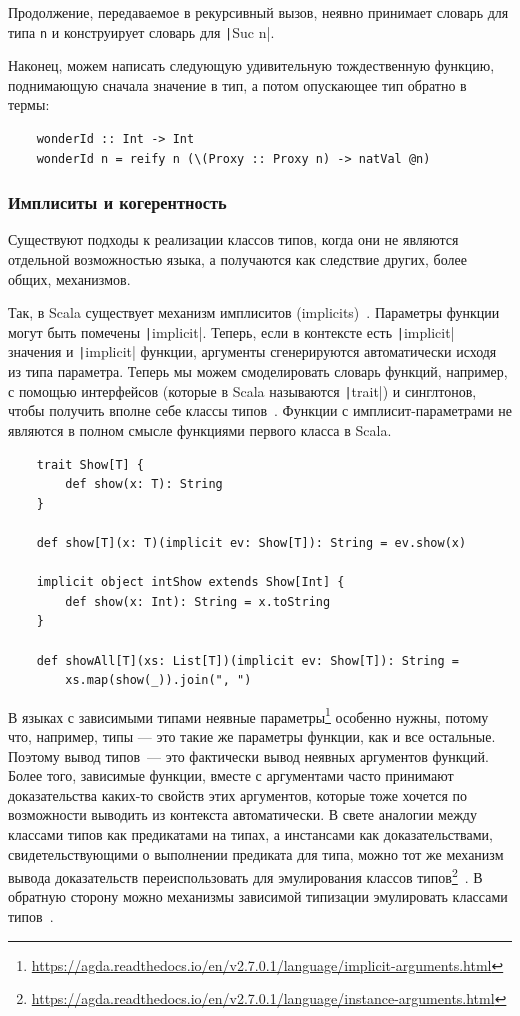 Продолжение, передаваемое в рекурсивный вызов, неявно принимает словарь для типа \texttt{n} и конструирует словарь для \texttt|Suc n|.

Наконец, можем написать следующую удивительную тождественную функцию, поднимающую сначала значение в тип, а потом опускающее тип обратно в термы:
\begin{verbatim}
    wonderId :: Int -> Int
    wonderId n = reify n (\(Proxy :: Proxy n) -> natVal @n)
\end{verbatim}

\subsubsection{Имплиситы и когерентность}

Существуют подходы к реализации классов типов, когда они не являются отдельной возможностью языка, а получаются как следствие других, более общих, механизмов.

Так, в Scala существует механизм имплиситов (implicits)~\cite{kvrikava2019scala}.
Параметры функции могут быть помечены \texttt|implicit|.
Теперь, если в контексте есть \texttt|implicit| значения и \texttt|implicit| функции, аргументы сгенерируются автоматически исходя из типа параметра.
Теперь мы можем смоделировать словарь функций, например, с помощью интерфейсов (которые в Scala называются \texttt|trait|) и синглтонов, чтобы получить вполне себе классы типов~\cite{oliveira2010type}.
Функции с имплисит-параметрами не являются в полном смысле функциями первого класса в Scala.
\begin{verbatim}
    trait Show[T] {
        def show(x: T): String
    }

    def show[T](x: T)(implicit ev: Show[T]): String = ev.show(x)

    implicit object intShow extends Show[Int] {
        def show(x: Int): String = x.toString
    }

    def showAll[T](xs: List[T])(implicit ev: Show[T]): String =
        xs.map(show(_)).join(", ")
\end{verbatim}

В языках с зависимыми типами неявные параметры\footnote{\url{https://agda.readthedocs.io/en/v2.7.0.1/language/implicit-arguments.html}} особенно нужны, потому что, например, типы --- это такие же параметры функции, как и все остальные.
Поэтому вывод типов~--- это фактически вывод неявных аргументов функций.
Более того, зависимые функции, вместе с аргументами часто принимают доказательства каких-то свойств этих аргументов, которые тоже хочется по возможности выводить из контекста автоматически.
В свете аналогии между классами типов как предикатами на типах, а инстансами как доказательствами, свидетельствующими о выполнении предиката для типа, можно тот же механизм вывода доказательств переиспользовать для эмулирования классов типов\footnote{\url{https://agda.readthedocs.io/en/v2.7.0.1/language/instance-arguments.html}}~\cite{devriese2011bright}.
В обратную сторону можно механизмы зависимой типизации эмулировать классами типов~\cite{mcbride2002faking}.

